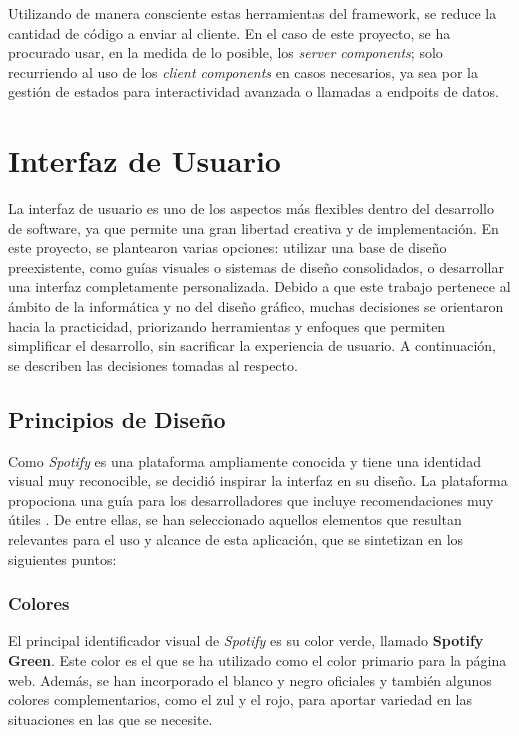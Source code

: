 Utilizando de manera consciente estas herramientas del framework, se reduce la cantidad de código a enviar al cliente. En el caso de este proyecto, se ha procurado usar, en la medida de lo posible, los \textit{server components}; solo recurriendo al uso de los \textit{client components} en casos necesarios, ya sea por la gestión de estados para interactividad avanzada o llamadas a endpoits de datos.

\section{Interfaz de Usuario}

La interfaz de usuario es uno de los aspectos más flexibles dentro del desarrollo de software, ya que permite una gran libertad creativa y de implementación. En este proyecto, se plantearon varias opciones: utilizar una base de diseño preexistente, como guías visuales o sistemas de diseño consolidados, o desarrollar una interfaz completamente personalizada. Debido a que este trabajo pertenece al ámbito de la informática y no del diseño gráfico, muchas decisiones se orientaron hacia la practicidad, priorizando herramientas y enfoques que permiten simplificar el desarrollo, sin sacrificar la experiencia de usuario. A continuación, se describen las decisiones tomadas al respecto.

\subsection{Principios de Diseño}

Como \textit{Spotify} es una plataforma ampliamente conocida y tiene una identidad visual muy reconocible, se decidió inspirar la interfaz en su diseño. La plataforma propociona una guía para los desarrolladores que incluye recomendaciones muy útiles \cite{spotifyDesign2025}. De entre ellas, se han seleccionado aquellos elementos que resultan relevantes para el uso y alcance de esta aplicación, que se sintetizan en los siguientes puntos:

\subsubsection*{Colores}

El principal identificador visual de \textit{Spotify} es su color verde, llamado \textbf{Spotify Green}. Este color es el que se ha utilizado como el color primario para la página web. Además, se han incorporado el blanco y negro oficiales y también algunos colores complementarios, como el zul y el rojo, para aportar variedad en las situaciones en las que se necesite.

